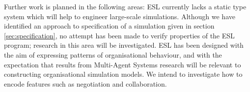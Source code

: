 \documentclass[10pt,numbers]{sigplanconf}
\begin{document}
Further work is planned in the following areas: ESL currently lacks a static type system which will help to engineer large-scale simulations. Although we have identified an approach to specification of a simulation given in section \ref{sec:specification}, no attempt has been made to verify properties of the ESL program; research in this area \cite{yasutake2015actario} will be investigated. ESL has been designed with the aim of expressing patterns of organisational behaviour, and with the expectation that results from Multi-Agent Systems research will be relevant to constructing organisational simulation models. We intend to investigate how to encode features such as negotiation and collaboration. 

\clearpage



\end{document}
